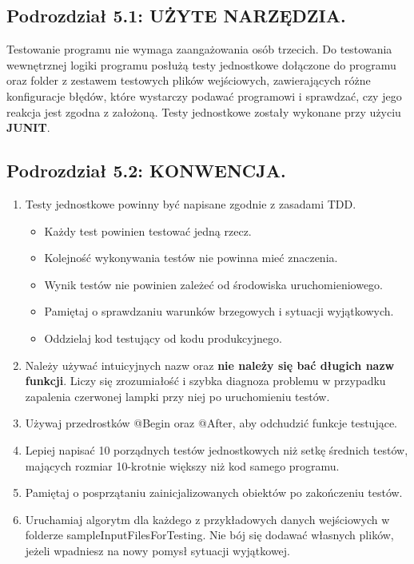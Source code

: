 \documentclass[a4paper]{article}
\begin{document}
\subsection*{Podrozdział 5.1: UŻYTE NARZĘDZIA.}
Testowanie programu nie wymaga zaangażowania osób trzecich. Do testowania wewnętrznej logiki programu posłużą testy jednostkowe dołączone do programu oraz folder z zestawem testowych plików wejściowych, zawierających różne konfiguracje błędów, które wystarczy podawać programowi i sprawdzać, czy jego reakcja jest zgodna z założoną. Testy jednostkowe zostały wykonane przy użyciu \textbf{JUNIT}.

\subsection*{Podrozdział 5.2: KONWENCJA.}
\begin{enumerate}
\item Testy jednostkowe powinny być napisane zgodnie z zasadami TDD.
	\begin{itemize}
	\item Każdy test powinien testować jedną rzecz.
	\item Kolejność wykonywania testów nie powinna mieć znaczenia.
	\item Wynik testów nie powinien zależeć od środowiska uruchomieniowego.
	\item Pamiętaj o sprawdzaniu warunków brzegowych i sytuacji wyjątkowych.
	\item Oddzielaj kod testujący od kodu produkcyjnego.
	\end{itemize}
\item Należy używać intuicyjnych nazw oraz \textbf{nie należy się bać długich nazw funkcji}. Liczy się zrozumiałość i szybka diagnoza problemu w przypadku zapalenia czerwonej lampki przy niej po uruchomieniu testów.
\item Używaj przedrostków @Begin oraz @After, aby odchudzić funkcje testujące.
\item Lepiej napisać 10 porządnych testów jednostkowych niż setkę średnich testów, mających rozmiar 10-krotnie większy niż kod samego programu.
\item Pamiętaj o posprzątaniu zainicjalizowanych obiektów po zakończeniu testów.
\item Uruchamiaj algorytm dla każdego z przykładowych danych wejściowych w folderze sampleInputFilesForTesting. Nie bój się dodawać własnych plików, jeżeli wpadniesz na nowy pomysł sytuacji wyjątkowej.
\end{enumerate}
\end{document}
